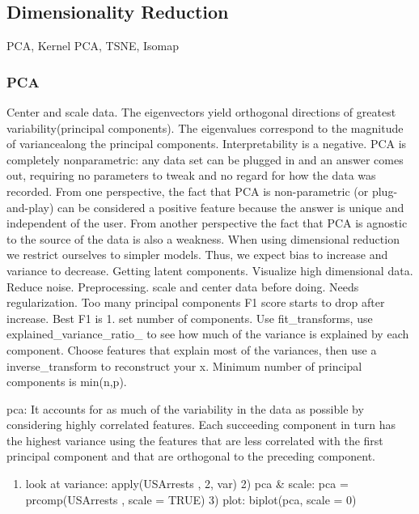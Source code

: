 \documentclass[]{book}
\providecommand{\tightlist}{%
  \setlength{\itemsep}{0pt}\setlength{\parskip}{0pt}}
\begin{document}
\hypertarget{dimensionality-reduction}{%
\subsection{Dimensionality Reduction}\label{dimensionality-reduction}}

PCA, Kernel PCA, TSNE, Isomap

\hypertarget{pca}{%
\subsubsection{PCA}\label{pca}}

Center and scale data. The eigenvectors yield orthogonal directions of greatest variability(principal components). The eigenvalues correspond to the magnitude of variancealong the principal components. Interpretability is a negative. PCA is completely nonparametric: any data set can be plugged in and an answer comes out, requiring no parameters to tweak and no regard for how the data was recorded. From one perspective, the fact that PCA is non-parametric (or plug-and-play) can be considered a positive feature because the answer is unique and independent of the user. From another perspective the fact that PCA is agnostic to the source of the data is also a weakness. When using dimensional reduction we restrict ourselves to simpler models. Thus, we expect bias to increase and variance to decrease. Getting latent components. Visualize high dimensional data. Reduce noise. Preprocessing. scale and center data before doing. Needs regularization. Too many principal components F1 score starts to drop after increase. Best F1 is 1. set number of components. Use fit\_transforms, use explained\_variance\_ratio\_ to see how much of the variance is explained by each component. Choose features that explain most of the variances, then use a inverse\_transform to reconstruct your x. Minimum number of principal components is min(n,p).

pca: It accounts for as much of the variability in the data as possible by considering highly correlated features. Each succeeding component in turn has the highest variance using the features that are less correlated with the first principal component and that are orthogonal to the preceding component.

\begin{enumerate}
\def\labelenumi{\arabic{enumi})}
\tightlist
\item
  look at variance: apply(USArrests , 2, var) \textbar{} 2) pca \& scale: pca = prcomp(USArrests , scale = TRUE) \textbar{} 3) plot: biplot(pca, scale = 0)
\end{enumerate}
\end{document}
